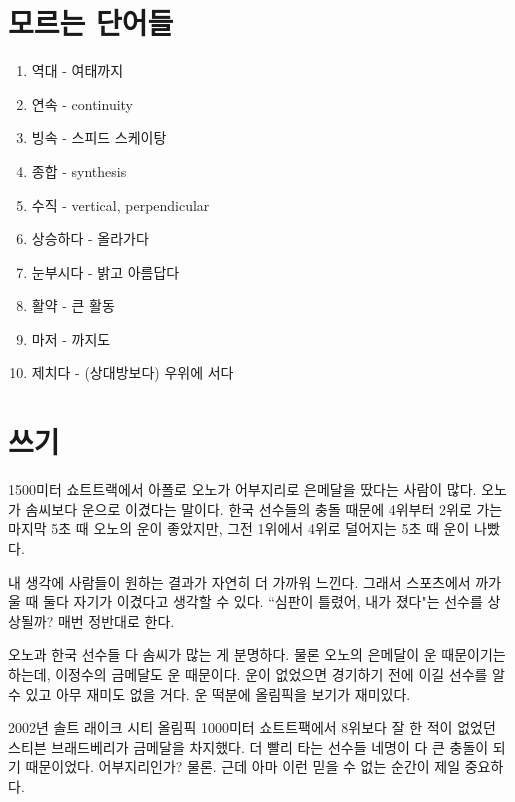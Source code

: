 \documentclass[11pt]{article}
\begin{document}
\section{모르는 단어들}
\begin{enumerate}
  \item 역대 - 여태까지
  \item 연속 - continuity
  \item 빙속 - 스피드 스케이탕
  \item 종합 - synthesis
  \item 수직 - vertical, perpendicular
  \item 상승하다 - 올라가다
  \item 눈부시다 - 밝고 아름답다
  \item 활약 - 큰 활동
  \item 마저 - 까지도
  \item 제치다 - (상대방보다) 우위에 서다 
\end{enumerate}

\section{쓰기}
\doublespacing
1500미터 쇼트트랙에서 아폴로 오노가 어부지리로 은메달을 땄다는 사람이 많다.  오노가 솜씨보다 운으로 이겼다는 말이다. 한국 선수들의 충돌 때문에 4위부터 2위로 가는 마지막 5초 때 오노의 운이 좋았지만, 그전 1위에서 4위로 덜어지는 5초 때 운이 나빴다. 

내 생각에 사람들이 원하는 결과가 자연히 더 가까워 느낀다. 그래서 스포츠에서 까가울 때 둘다 자기가 이겼다고 생각할 수 있다.  ``심판이 틀렸어, 내가 졌다"는 선수를 상상될까? 매번 정반대로 한다.

오노과 한국 선수들 다 솜씨가 많는 게 분명하다. 물론 오노의 은메달이 운 때문이기는 하는데, 이정수의 금메달도 운 때문이다. 운이 없었으면 경기하기 전에 이길 선수를 알 수 있고 아무 재미도 없을 거다. 운 떡분에 올림픽을 보기가 재미있다.

2002년 솔트 래이크 시티 올림픽 1000미터 쇼트트팩에서 8위보다 잘 한 적이 없었던 스티븐 브래드베리가 금메달을 차지했다. 더 빨리 타는 선수들 네명이 다 큰 충돌이 되기 때문이었다. 어부지리인가? 물론. 근데 아마 이런 믿을 수 없는 순간이 제일 중요하다.
\end{document}
